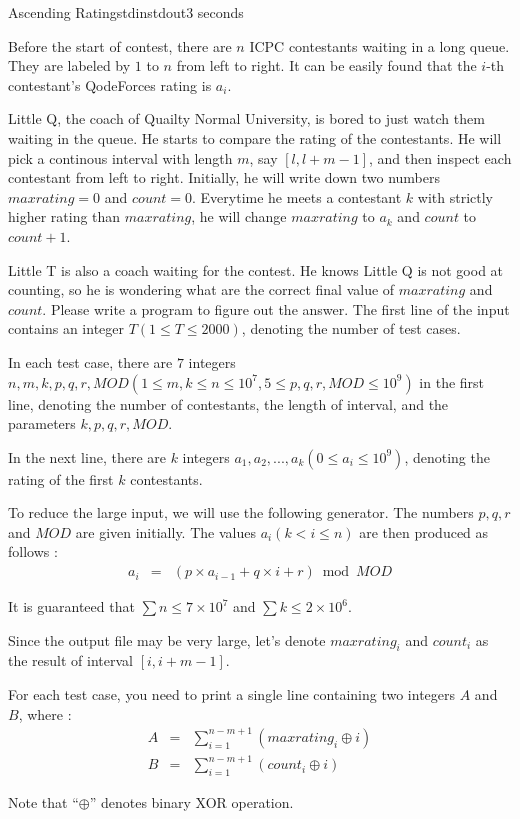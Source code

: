 \documentclass[11pt,a4paper,oneside]{article}
\newcommand{\timeLimit}{2 seconds}
\renewcommand{\defaultmemorylimit}{512 megabytes}
\begin{document}
\renewcommand{\timeLimit}{3 seconds}
\renewcommand{\defaultmemorylimit}{512 megabytes}
\begin{problem}{Ascending Rating}{stdin}{stdout}{\timeLimit}

Before the start of contest, there are $n$ ICPC contestants waiting in a long queue. They are labeled by $1$ to $n$ from left to right. It can be easily found that the $i$-th contestant's QodeForces rating is $a_i$.\par
Little Q, the coach of Quailty Normal University, is bored to just watch them waiting in the queue. He starts to compare the rating of the contestants. He will pick a continous interval with length $m$, say $[l,l+m-1]$, and then inspect each contestant from left to right. Initially, he will write down two numbers $maxrating=0$ and $count=0$. Everytime he meets a contestant $k$ with strictly higher rating than $maxrating$, he will change $maxrating$ to $a_k$ and $count$ to $count+1$.\par
Little T is also a coach waiting for the contest. He knows Little Q is not good at counting, so he is wondering what are the correct final value of $maxrating$ and $count$. Please write a program to figure out the answer.
\InputFile
The first line of the input contains an integer $T(1\leq T\leq2000)$, denoting the number of test cases.\par
In each test case, there are $7$ integers $n,m,k,p,q,r,MOD(1\leq m,k\leq n\leq 10^7,5\leq p,q,r,MOD\leq 10^9)$ in the first line, denoting the number of contestants, the length of interval, and the parameters $k,p,q,r,MOD$.\par
In the next line, there are $k$ integers $a_1,a_2,...,a_k(0\leq a_i\leq 10^9)$, denoting the rating of the first $k$ contestants.\par
To reduce the large input, we will use the following generator. The numbers $p,q,r$ and $MOD$ are given initially. The values $a_i(k<i\leq n)$ are then produced as follows :
\begin{eqnarray*}
a_i&=&(p\times a_{i-1}+q\times i+r)\bmod MOD
\end{eqnarray*}\par
It is guaranteed that $\sum n\leq 7\times 10^7$ and $\sum k\leq 2\times 10^6$.

\OutputFile
Since the output file may be very large, let's denote $maxrating_i$ and $count_i$ as the result of interval $[i,i+m-1]$.\par
For each test case, you need to print a single line containing two integers $A$ and $B$, where :
\begin{eqnarray*}
A&=&\sum_{i=1}^{n-m+1} (maxrating_i\oplus i)\\
B&=&\sum_{i=1}^{n-m+1} (count_i\oplus i)
\end{eqnarray*}\par
Note that ``$\oplus$'' denotes binary XOR operation.
\Examples
\begin{example}
%
\end{example}
\end{problem}
\end{document}
